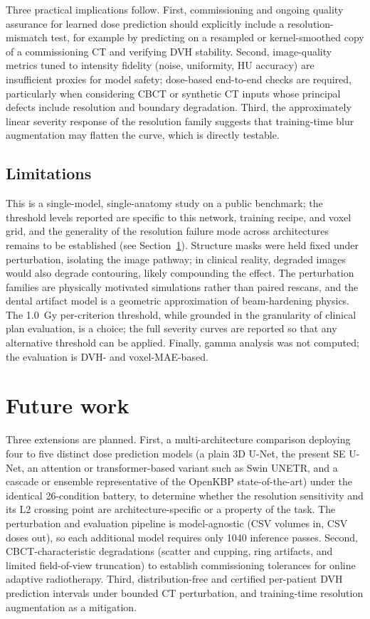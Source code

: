 \documentclass[11pt]{article}
\begin{document}
Three practical implications follow. First, commissioning and ongoing quality
assurance for learned dose prediction should explicitly include a
resolution-mismatch test, for example by predicting on a resampled or
kernel-smoothed copy of a commissioning CT and verifying DVH stability.
Second, image-quality metrics tuned to intensity fidelity (noise, uniformity,
HU accuracy) are insufficient proxies for model safety; dose-based
end-to-end checks are required, particularly when considering CBCT or
synthetic CT inputs whose principal defects include resolution and boundary
degradation. Third, the approximately linear severity response of the
resolution family suggests that training-time blur augmentation may flatten
the curve, which is directly testable.

\subsection{Limitations}

This is a single-model, single-anatomy study on a public benchmark; the
threshold levels reported are specific to this network, training recipe, and
voxel grid, and the generality of the resolution failure mode across
architectures remains to be established (see Section~\ref{sec:future}).
Structure masks were held fixed under perturbation, isolating the image
pathway; in clinical reality, degraded images would also degrade contouring,
likely compounding the effect. The perturbation families are physically
motivated simulations rather than paired rescans, and the dental artifact
model is a geometric approximation of beam-hardening physics. The 1.0~Gy
per-criterion threshold, while grounded in the granularity of clinical plan
evaluation, is a choice; the full severity curves are reported so that any
alternative threshold can be applied. Finally, gamma analysis was not
computed; the evaluation is DVH- and voxel-MAE-based.

\section{Future work}
\label{sec:future}

Three extensions are planned. First, a multi-architecture comparison
deploying four to five distinct dose prediction models (a plain 3D U-Net, the
present SE U-Net, an attention or transformer-based variant such as Swin
UNETR, and a cascade or ensemble representative of the OpenKBP
state-of-the-art) under the identical 26-condition battery, to determine
whether the resolution sensitivity and its L2 crossing point are
architecture-specific or a property of the task. The perturbation and
evaluation pipeline is model-agnostic (CSV volumes in, CSV doses out), so
each additional model requires only 1040 inference passes. Second,
CBCT-characteristic degradations (scatter and cupping, ring artifacts, and
limited field-of-view truncation) to establish commissioning tolerances for
online adaptive radiotherapy. Third, distribution-free and certified
per-patient DVH prediction intervals under bounded CT perturbation, and
training-time resolution augmentation as a mitigation.
\end{document}
